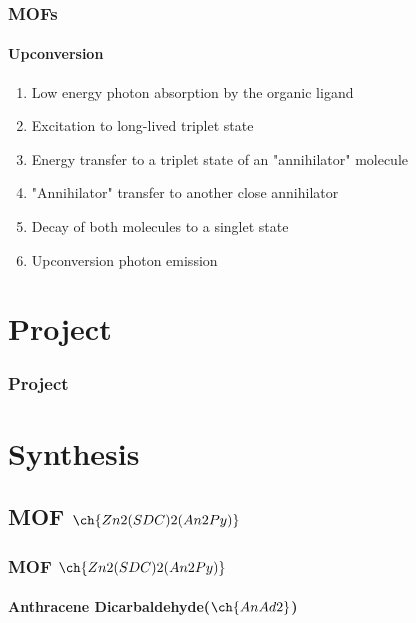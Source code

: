 \documentclass[aspectratio=169,fleqn,table]{beamer}
\begin{document}
\begin{frame}
\frametitle{MOFs}
\framesubtitle{Upconversion}
\begin{enumerate}
    \item
    Low energy photon absorption by the organic ligand
    \item
    Excitation to long-lived triplet state
    \item
    Energy transfer to a triplet state of an "annihilator" molecule
    \item
    "Annihilator" transfer to another close annihilator
    \item
    Decay of both molecules to a singlet state
    \item
    Upconversion photon emission
\end{enumerate}

\end{frame}

\section{Project}


\begin{frame}[plain]
\frametitle{Project}

\vspace{-35pt}
\begin{figure}[border=1pt]
\end{figure}

\end{frame}




\section{Synthesis}


\subsection{MOF $\ch{Zn2(SDC)2(An2Py)}$}

\begin{frame}
\frametitle{MOF $\ch{Zn2(SDC)2(An2Py)}$}
\framesubtitle{Anthracene Dicarbaldehyde($\ch{AnAd2}$)}

\vspace{-35pt}
\begin{figure}[border=1pt]
\end{figure}

\end{frame}
\end{document}
